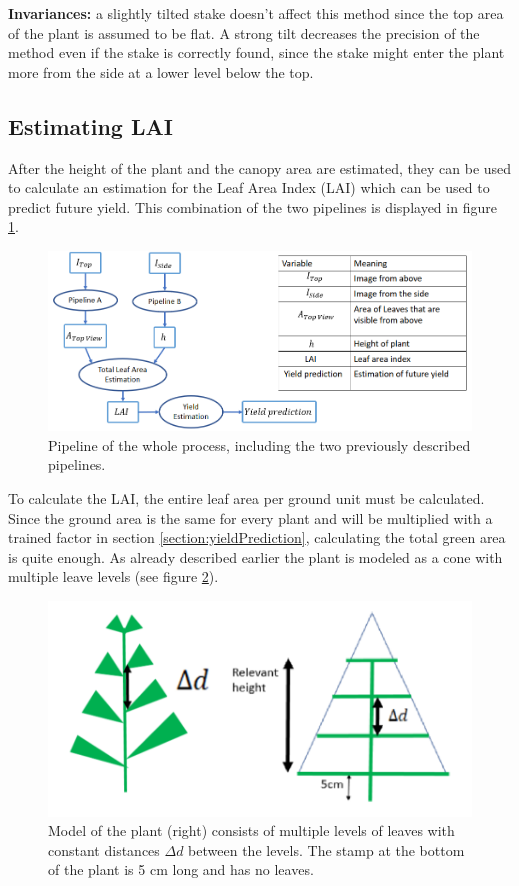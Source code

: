 \textbf{Invariances:} a slightly tilted stake doesn't affect this method since the top
area of the plant is assumed to be flat. A strong tilt decreases the precision of
the method even if the stake is correctly found, since the stake might enter the
plant more from the side at a lower level below the top.

\subsection{Estimating LAI}\label{subsec:estimating-lai}


\label{section:EstLAI}
After the height of the plant and the canopy area are estimated, they can be used to calculate an estimation for the Leaf Area Index (LAI) which can be used to predict future yield. This combination of the two pipelines is displayed in figure \ref{fig:wholePipeline}.
   \begin{figure}[H]
       \centering
       \includegraphics[scale=0.8]{wholePipeline.PNG}
       \caption{Pipeline of the whole process, including the two previously described pipelines.}
       \label{fig:wholePipeline}
   \end{figure}

To calculate the LAI, the entire leaf area per ground unit must be calculated.
Since the ground area is the same for every plant and will be multiplied with
a trained factor in section \ref{section:yieldPrediction}, calculating the total
green area is quite enough. As already described earlier the plant is modeled as
a cone with multiple leave levels (see figure \ref{fig:branchRepetition}).

\begin{figure}[H]
   \centering
   \includegraphics[scale=0.6]{branchRepetition.PNG}
   \caption{Model of the plant (right) consists of multiple levels of leaves with constant distances $\Delta d$ between the levels. The stamp at the bottom of the plant is 5 cm long and has no leaves.}
   \label{fig:branchRepetition}
\end{figure}

